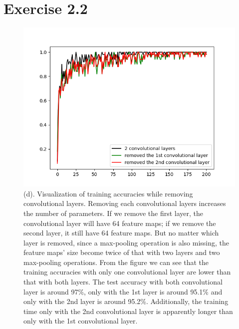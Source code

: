 \documentclass[11pt]{article} %
\begin{document}
\section*{Exercise 2.2}
\begin{figure}[htb]
  \centering
  \centerline{\includegraphics[width=1\textwidth ]{Figure_2_4.png}}
  \vspace{-5pt}
    \centering
\caption{(d). Visualization of training accuracies while removing convolutional layers. Removing each convolutional layers increases the number of parameters. If we remove the first layer, the convolutional layer will have 64 feature maps; if we remove the second layer, it still have 64 feature maps. But no matter which layer is removed, since a max-pooling operation is also missing, the feature maps' size become twice of that with two layers and two max-pooling operations. From the figure we can see that the training accuracies with only one convolutional layer are lower than that with both layers. The test accuracy with both convolutional layer is around 97\%, only with the 1st layer is around 95.1\% and only with the 2nd layer is around 95.2\%. Additionally, the training time only with the 2nd convolutional layer is apparently longer than only with the 1st convolutional layer.}
\vspace{-1pt}
\end{figure}
\end{document}
